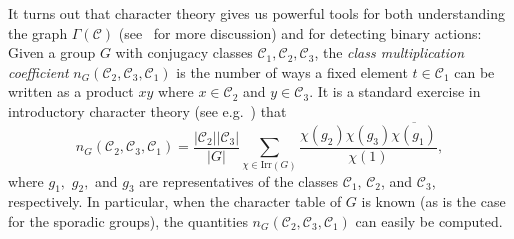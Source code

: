 \documentclass[11pt, a4paper]{amsart}
\begin{document}
  
 
 

  
It turns out that character theory gives us powerful tools for both understanding the graph $\Gamma(\mathcal{C})$ (see~\cite{CDP} for more discussion) and for detecting binary actions: Given a group $G$ with conjugacy classes $\mathcal{C}_1,\mathcal{C}_2,\mathcal{C}_3$, the \emph{class multiplication coefficient} $n_G(\mathcal{C}_2,\mathcal{C}_3,\mathcal{C}_1)$ is the number of ways a fixed element $t\in \mathcal{C}_1$ can be written as a product $xy$ where $x\in\mathcal{C}_2$ and $y\in \mathcal{C}_3$. It is a standard exercise in introductory character theory (see e.g.~\cite[Problems (3.9)]{I94}) that $$n_G({\mathcal{C}_2,\mathcal{C}_3,\mathcal{C}_1})=\frac{|\mathcal{C}_2||\mathcal{C}_3|}{|G|}\sum_{\chi\in\mathrm{Irr}(G)}\frac{\chi(g_2)\chi(g_3)\overline{\chi(g_1)}}{\chi(1)},$$ where $g_1,$ $g_2,$ and $g_3$ are representatives of the classes $\mathcal{C}_1$, $\mathcal{C}_2$, and $\mathcal{C}_3$, respectively. In particular, when the character table of $G$ is known (as is the case for the sporadic groups), the quantities $n_G(\mathcal{C}_2,\mathcal{C}_3,\mathcal{C}_1)$ can easily be computed. 

  
  
\end{document}
